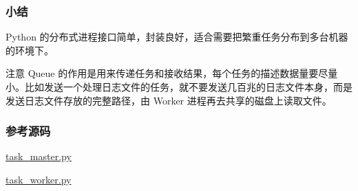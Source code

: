 \hypertarget{ux5c0fux7ed3}{%
\subsubsection{小结}\label{ux5c0fux7ed3}}

Python
的分布式进程接口简单，封装良好，适合需要把繁重任务分布到多台机器的环境下。

注意 Queue
的作用是用来传递任务和接收结果，每个任务的描述数据量要尽量小。比如发送一个处理日志文件的任务，就不要发送几百兆的日志文件本身，而是发送日志文件存放的完整路径，由
Worker 进程再去共享的磁盘上读取文件。

\hypertarget{ux53c2ux8003ux6e90ux7801}{%
\subsubsection{参考源码}\label{ux53c2ux8003ux6e90ux7801}}

\href{https://github.com/michaelliao/learn-python3/blob/master/samples/multitask/task_master.py}{task\_master.py}

\href{https://github.com/michaelliao/learn-python3/blob/master/samples/multitask/task_worker.py}{task\_worker.py}

